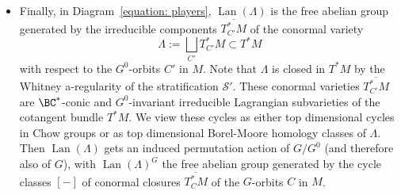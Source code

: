 \documentclass[11pt,letterpaper]{amsart}
\numberwithin{equation}{section}
\begin{document}
\begin{itemize}
This motivates the definition
\begin{equation}\label{equation: stalks 5}
\chi^\mathrm{mic}_C(\mathcal{F}) \ceq (-1)^{\dim C} \chi(\operatorname{NMD}(\operatorname{For}\mathcal{F},df_x)) 
=
(-1)^{\dim C} \chi\left( \left(R\Phi_{f\vert_{N}}[-1](\operatorname{For}\mathcal{F}\vert_{N})\right)_x\right),
\end{equation}
with $df_x \in (T^*_C M)^\reg$; with this definition, we have
\begin{equation}
\operatorname{CC}(\mathcal{F})
=
\sum_{C} \chi^\mic_C(\operatorname{For}\mathcal{F}) [\overline{T^*_C M}].
\end{equation}
The diagonal $\operatorname{CC}$ factorizes over the group of $G$-invariant constructible functions since it is determined by the Euler characteristics of the normal Morse data as explained in \cite{MS22}*{Section 3.3} and \cite{Sch03}*{Section 5.2}; this defines the horizontal $\operatorname{CC}$.
Also note that Verdier duality $\mathcal{D}$ commutes with normal Morse data up to a shift
\cite{Sch03}*{(5.11), p. 281}
$$\mathcal{D}(\operatorname{NMD}(\operatorname{For}\mathcal{F},df_x))\simeq
\operatorname{NMD}(\mathcal{D}(\operatorname{For}\mathcal{F}),-df_x)[-2\dim C]$$
for $x\in C$, together with switching from $df_x$ to $-df_x$. In particular
$\chi^\mathrm{mic}_C$ and $\operatorname{CC}$
are invariant under Verdier duality $\mathcal{D}$.
\item 
Finally, in Diagram~\eqref{equation: players}, $\operatorname{Lan}(\Lambda)$ is the free abelian group generated by the irreducible components $\overline{T^*_{C'} M}$ of the conormal variety 
$$\Lambda:= \bigsqcup_{C'} T^*_{C'} M \subset T^*M$$ with respect to the $G^0$-orbits 
$C'$ in $M$. Note that $\Lambda$ is closed in $T^*M$ by the Whitney a-regularity of the stratification $\mathscr{S}'$.
These conormal varieties $\overline{T^*_{C'} M}$ are $\BC^*$-conic and $G^0$-invariant irreducible Lagrangian subvarieties of the cotangent bundle $T^*M$. We view these cycles as either top dimensional cycles  in Chow groups or as top dimensional  Borel-Moore homology classes of $\Lambda$.
Then $\operatorname{Lan}(\Lambda)$ gets an induced permutation action of $G/G^0$ (and therefore also of $G$),
with $\operatorname{Lan}(\Lambda)^{G}$ the free  abelian group generated by the cycle classes $[-]$ of conormal closures
$\overline{T^*_{C} M}$ of the $G$-orbits $C$ in $M$.
\end{itemize}
\end{document}
